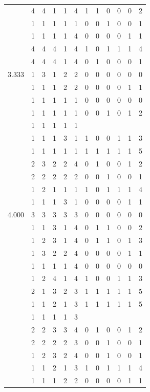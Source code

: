 \documentclass[]{book}
\theoremstyle{definition}
\theoremstyle{definition}
\theoremstyle{definition}
\theoremstyle{remark}
\begin{document}
\begin{table}
{\begin{tabular}[t]{rrrrrrrrrrrr}
 & 4 & 4 & 1 & 1 & 4 & 1 & 1 & 0 & 0 & 0 & 2\\
 & 1 & 1 & 1 & 1 & 1 & 0 & 0 & 1 & 0 & 0 & 1\\
 & 1 & 1 & 1 & 1 & 4 & 0 & 0 & 0 & 0 & 1 & 1\\
 & 4 & 4 & 4 & 1 & 4 & 1 & 0 & 1 & 1 & 1 & 4\\
 & 4 & 4 & 4 & 1 & 4 & 0 & 1 & 0 & 0 & 0 & 1\\
3.333 & 1 & 3 & 1 & 2 & 2 & 0 & 0 & 0 & 0 & 0 & 0\\
 & 1 & 1 & 1 & 2 & 2 & 0 & 0 & 0 & 0 & 1 & 1\\
 & 1 & 1 & 1 & 1 & 1 & 0 & 0 & 0 & 0 & 0 & 0\\
 & 1 & 1 & 1 & 1 & 1 & 0 & 0 & 1 & 0 & 1 & 2\\
 & 1 & 1 & 1 & 1 & 1 &  &  &  &  &  & \\
 & 1 & 1 & 1 & 3 & 1 & 1 & 0 & 0 & 1 & 1 & 3\\
 & 1 & 1 & 1 & 1 & 1 & 1 & 1 & 1 & 1 & 1 & 5\\
 & 2 & 3 & 2 & 2 & 4 & 0 & 1 & 0 & 0 & 1 & 2\\
 & 2 & 2 & 2 & 2 & 2 & 0 & 0 & 1 & 0 & 0 & 1\\
 & 1 & 2 & 1 & 1 & 1 & 1 & 0 & 1 & 1 & 1 & 4\\
 & 1 & 1 & 1 & 3 & 1 & 0 & 0 & 0 & 0 & 1 & 1\\
4.000 & 3 & 3 & 3 & 3 & 3 & 0 & 0 & 0 & 0 & 0 & 0\\
 & 1 & 1 & 3 & 1 & 4 & 0 & 1 & 1 & 0 & 0 & 2\\
 & 1 & 2 & 3 & 1 & 4 & 0 & 1 & 1 & 0 & 1 & 3\\
 & 1 & 3 & 2 & 2 & 4 & 0 & 0 & 0 & 0 & 1 & 1\\
 & 1 & 1 & 1 & 1 & 4 & 0 & 0 & 0 & 0 & 0 & 0\\
 & 1 & 2 & 4 & 1 & 4 & 1 & 0 & 0 & 1 & 1 & 3\\
 & 2 & 1 & 3 & 2 & 3 & 1 & 1 & 1 & 1 & 1 & 5\\
 & 1 & 1 & 2 & 1 & 3 & 1 & 1 & 1 & 1 & 1 & 5\\
 & 1 & 1 & 1 & 1 & 3 &  &  &  &  &  & \\
 & 2 & 2 & 3 & 3 & 4 & 0 & 1 & 0 & 0 & 1 & 2\\
 & 2 & 2 & 2 & 2 & 3 & 0 & 0 & 1 & 0 & 0 & 1\\
 & 1 & 2 & 3 & 2 & 4 & 0 & 0 & 1 & 0 & 0 & 1\\
 & 1 & 1 & 2 & 1 & 3 & 1 & 0 & 1 & 1 & 1 & 4\\
 & 1 & 1 & 1 & 2 & 2 & 0 & 0 & 0 & 0 & 1 & 1\\

\end{tabular}}
\end{table}
\end{document}
